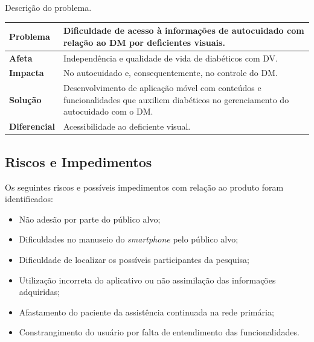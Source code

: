 \begin{quadro}[htb]
    \caption{Descrição do problema.}
    \label{qua-desc-pro}
    \begin{center}
        \begin{tabular}{p{4.0cm}|p{10.0cm}}
            \textbf{Problema}    & Dificuldade de acesso à informações de autocuidado com relação ao DM por deficientes visuais.                                          \\
            \hline
            \textbf{Afeta}       & Independência e qualidade de vida de diabéticos com DV\@.                                                                              \\
            \hline
            \textbf{Impacta}     & No autocuidado e, consequentemente, no controle do DM\@.                                                                               \\
            \hline
            \textbf{Solução}     & Desenvolvimento de aplicação móvel com conteúdos e funcionalidades que auxiliem diabéticos no gerenciamento do autocuidado com o DM\@. \\
            \hline
            \textbf{Diferencial} & Acessibilidade ao deficiente visual.
        \end{tabular}
    \end{center}
\end{quadro}

\subsection{Riscos e Impedimentos}

Os seguintes riscos e possíveis impedimentos com relação ao produto foram identificados:

\begin{itemize}
    \item Não adesão por parte do público alvo;
    \item Dificuldades no manuseio do \emph{smartphone} pelo público alvo;
    \item Dificuldade de localizar os possíveis participantes da pesquisa;
    \item Utilização incorreta do aplicativo ou não assimilação das informações adquiridas;
    \item Afastamento do paciente da assistência continuada na rede primária;
    \item Constrangimento do usuário por falta de entendimento das funcionalidades.
\end{itemize}

